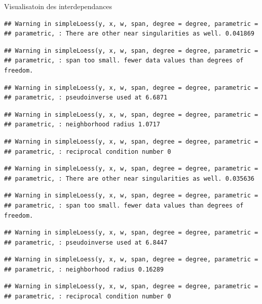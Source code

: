 \documentclass[11pt,ignorenonframetext,]{beamer}
\begin{document}
\begin{frame}[fragile]{Visualisatoin des interdependances}
\begin{verbatim}
## Warning in simpleLoess(y, x, w, span, degree = degree, parametric =
## parametric, : There are other near singularities as well. 0.041869
\end{verbatim}

\begin{verbatim}
## Warning in simpleLoess(y, x, w, span, degree = degree, parametric =
## parametric, : span too small. fewer data values than degrees of freedom.
\end{verbatim}

\begin{verbatim}
## Warning in simpleLoess(y, x, w, span, degree = degree, parametric =
## parametric, : pseudoinverse used at 6.6871
\end{verbatim}

\begin{verbatim}
## Warning in simpleLoess(y, x, w, span, degree = degree, parametric =
## parametric, : neighborhood radius 1.0717
\end{verbatim}

\begin{verbatim}
## Warning in simpleLoess(y, x, w, span, degree = degree, parametric =
## parametric, : reciprocal condition number 0
\end{verbatim}

\begin{verbatim}
## Warning in simpleLoess(y, x, w, span, degree = degree, parametric =
## parametric, : There are other near singularities as well. 0.035636
\end{verbatim}

\begin{verbatim}
## Warning in simpleLoess(y, x, w, span, degree = degree, parametric =
## parametric, : span too small. fewer data values than degrees of freedom.
\end{verbatim}

\begin{verbatim}
## Warning in simpleLoess(y, x, w, span, degree = degree, parametric =
## parametric, : pseudoinverse used at 6.8447
\end{verbatim}

\begin{verbatim}
## Warning in simpleLoess(y, x, w, span, degree = degree, parametric =
## parametric, : neighborhood radius 0.16289
\end{verbatim}

\begin{verbatim}
## Warning in simpleLoess(y, x, w, span, degree = degree, parametric =
## parametric, : reciprocal condition number 0
\end{verbatim}


\end{frame}
\end{document}
